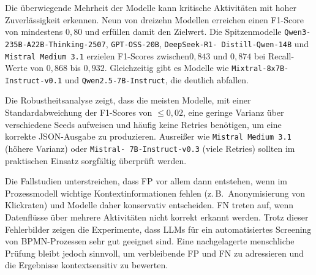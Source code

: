 Die überwiegende Mehrheit der Modelle kann kritische Aktivitäten mit hoher Zuverlässigkeit erkennen. Neun von dreizehn Modellen erreichen einen F1-Score von mindestens $0{,}80$ und erfüllen damit den Zielwert. Die Spitzenmodelle \texttt{Qwen3-235B-A22B-Thinking-2507}, \texttt{GPT-OSS-20B}, \texttt{DeepSeek-R1-\linebreak~Distill-Qwen-14B} und \texttt{Mistral Medium 3.1} erzielen F1-Scores zwischen\linebreak$0{,}843$ und $0{,}874$ bei Recall-Werte von $0{,}868$ bis $0{,}932$. Gleichzeitig gibt es Modelle wie \texttt{Mixtral-8x7B-Instruct-v0.1} und \texttt{Qwen2.5-7B-Instruct}, die deutlich abfallen.

Die Robustheitsanalyse zeigt, dass die meisten Modelle, mit einer Standardabweichung der F1-Scores von $\leq 0{,}02$, eine geringe Varianz über verschiedene Seeds aufweisen und häufig keine Retries benötigen, um eine korrekte JSON-Ausgabe zu produzieren. Ausreißer wie \texttt{Mistral Medium 3.1} (höhere Varianz) oder \texttt{Mistral-\linebreak~7B-Instruct-v0.3} (viele Retries) sollten im praktischen Einsatz sorgfältig überprüft werden.

Die Fallstudien unterstreichen, dass \ac{FP} vor allem dann entstehen, wenn im Prozessmodell wichtige Kontextinformationen fehlen (z.\,B.\ Anonymisierung von Klickraten) und Modelle daher konservativ entscheiden. \ac{FN} treten auf, wenn Datenflüsse über mehrere Aktivitäten nicht korrekt erkannt werden. Trotz dieser Fehlerbilder zeigen die Experimente, dass \acp{LLM} für ein automatisiertes Screening von \ac{BPMN}-Prozessen sehr gut geeignet sind. Eine nachgelagerte menschliche Prüfung bleibt jedoch sinnvoll, um verbleibende \ac{FP} und \ac{FN} zu adressieren und die Ergebnisse kontextsensitiv zu bewerten.